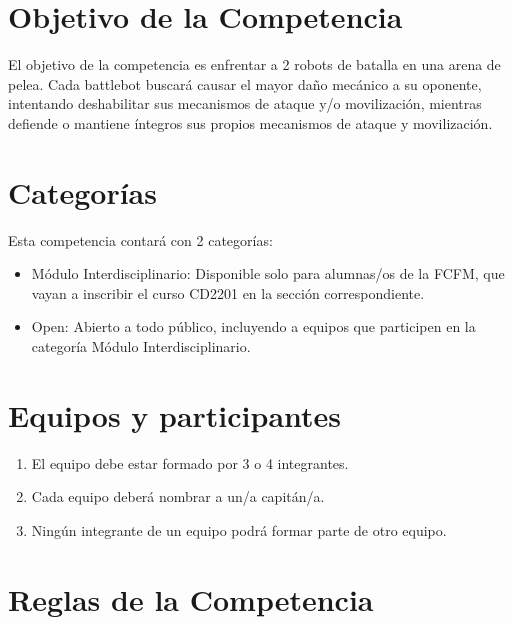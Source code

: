 \documentclass[11pt]{article}
\begin{document}
\pagebreak

\section{Objetivo de la Competencia}

El objetivo de la competencia es enfrentar a 2 robots de batalla en una arena de pelea. Cada battlebot buscará causar el mayor daño mecánico a su oponente, intentando deshabilitar sus mecanismos de ataque y/o movilización, mientras defiende o mantiene íntegros sus propios mecanismos de ataque y movilización.

\section{Categorías}
Esta competencia contará con 2 categorías:
\begin{itemize}
    \item Módulo Interdisciplinario: Disponible solo para alumnas/os de la FCFM, que vayan a inscribir el curso CD2201 en la sección correspondiente.
    \item Open: Abierto a todo público, incluyendo a equipos que participen en la categoría Módulo Interdisciplinario.
\end{itemize}

\section{Equipos y participantes}

\begin{enumerate}
    \item El equipo debe estar formado por 3 o 4 integrantes.
    \item Cada equipo deberá nombrar a un/a capitán/a.
    \item Ningún integrante de un equipo podrá formar parte de otro equipo.
\end{enumerate}

\section{Reglas de la Competencia}
\end{document}
